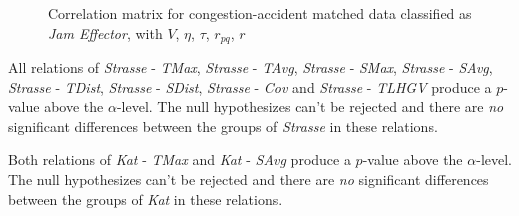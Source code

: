 \begin{figure}[!ht]
	\centering
	\caption{Correlation matrix for congestion-accident matched data classified as \textit{Jam Effector}, with $V$, $\eta$, $\tau$, $r_{pq}$, $r$}
	\label{img:correlation_matrix_selected_effector_cramers}
\end{figure}

All relations of \textit{Strasse} - \textit{TMax}, \textit{Strasse} - \textit{TAvg}, \textit{Strasse} - \textit{SMax}, \textit{Strasse} - \textit{SAvg}, \textit{Strasse} - \textit{TDist}, \textit{Strasse} - \textit{SDist}, \textit{Strasse} - \textit{Cov} and \textit{Strasse} - \textit{TLHGV} produce a $p$-value above the $\alpha$-level. The null hypothesizes can't be rejected and there are \textit{no} significant differences between the groups of \textit{Strasse} in these relations.

Both relations of \textit{Kat} - \textit{TMax} and \textit{Kat} - \textit{SAvg} produce a $p$-value above the $\alpha$-level. The null hypothesizes can't be rejected and there are \textit{no} significant differences between the groups of \textit{Kat} in these relations.

